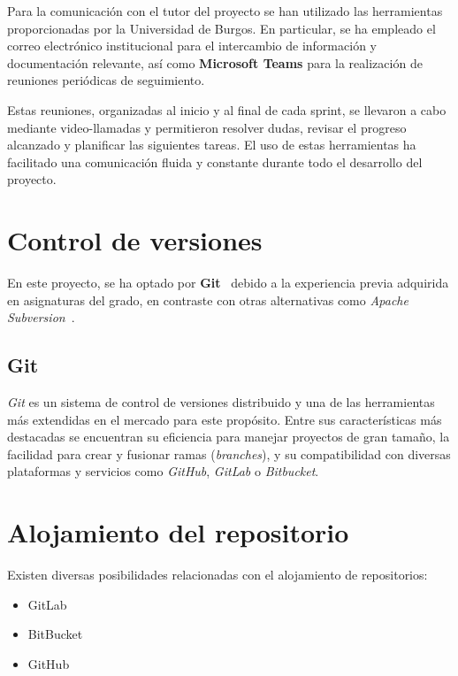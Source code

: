 Para la comunicación con el tutor del proyecto se han utilizado las herramientas proporcionadas por la Universidad de Burgos. 
En particular, se ha empleado el correo electrónico institucional para el intercambio de información y documentación relevante, 
así como \textbf{Microsoft Teams} para la realización de reuniones periódicas de seguimiento.

Estas reuniones, organizadas al inicio y al final de cada sprint, se llevaron a cabo mediante video-llamadas y permitieron resolver dudas,
revisar el progreso alcanzado y planificar las siguientes tareas. El uso de estas herramientas ha facilitado una comunicación fluida y constante durante todo el desarrollo del proyecto.

\section{Control de versiones}

En este proyecto, se ha optado por \textbf{Git}~\cite{web:Git} debido a la experiencia previa adquirida en asignaturas del grado, 
en contraste con otras alternativas como \textit{Apache Subversion}~\cite{web:Subversion}.

\subsection{Git}

\textit{Git} es un sistema de control de versiones distribuido y una de las herramientas 
más extendidas en el mercado para este propósito. Entre sus características más destacadas se 
encuentran su eficiencia para manejar proyectos de gran tamaño, la facilidad para crear y fusionar 
ramas (\textit{branches}), y su compatibilidad con diversas plataformas y servicios como \textit{GitHub}, \textit{GitLab} o \textit{Bitbucket}.


\section{Alojamiento del repositorio}

Existen diversas posibilidades relacionadas con el alojamiento de repositorios:

\begin{itemize}
    \item GitLab~\cite{web:GitLab}
    \item BitBucket~\cite{web:Bitbucket}
    \item GitHub~\cite{web:GitHub}
\end{itemize}

